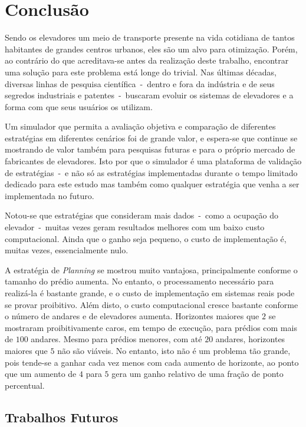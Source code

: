 \chapter{\label{chap:conclusion}Conclusão}

Sendo os elevadores um meio de transporte presente na vida cotidiana de tantos
habitantes de grandes centros urbanos, eles são um alvo para otimização. Porém,
ao contrário do que acreditava-se antes da realização deste trabalho, encontrar
uma solução para este problema está longe do trivial. Nas últimas décadas,
diversas linhas de pesquisa científica~-~dentro e fora da indústria e de seus
segredos industriais e patentes~-~buscaram evoluir os sistemas de elevadores e a
forma com que seus usuários os utilizam.

Um simulador que permita a avaliação objetiva e comparação de diferentes
estratégias em diferentes cenários foi de grande valor, e espera-se que continue
se mostrando de valor também para pesquisas futuras e para o próprio mercado de
fabricantes de elevadores. Isto por que o simulador é uma plataforma de
validação de estratégias~-~e não só as estratégias implementadas durante o tempo
limitado dedicado para este estudo mas também como qualquer estratégia que venha
a ser implementada no futuro.

Notou-se que estratégias que consideram mais dados~-~como a ocupação do
elevador~-~muitas vezes geram resultados melhores com um baixo custo
computacional. Ainda que o ganho seja pequeno, o custo de implementação é,
muitas vezes, essencialmente nulo.

A estratégia de \textit{Planning} se mostrou muito vantajosa, principalmente
conforme o tamanho do prédio aumenta. No entanto, o processamento necessário
para realizá-la é bastante grande, e o custo de implementação em sistemas reais
pode se provar proibitivo. Além disto, o custo computacional cresce bastante
conforme o número de andares e de elevadores aumenta. Horizontes maiores que $2$
se mostraram proibitivamente caros, em tempo de execução, para prédios com mais
de $100$ andares. Mesmo para prédios menores, com até $20$ andares, horizontes
maiores que $5$ não são viáveis. No entanto, isto não é um problema tão grande,
pois tende-se a ganhar cada vez menos com cada aumento de horizonte, ao ponto
que um aumento de $4$ para $5$ gera um ganho relativo de uma fração de ponto percentual.

\section{Trabalhos Futuros}

